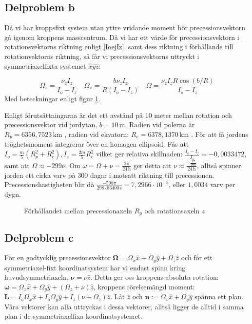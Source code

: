 \documentclass[12pt,a4paper]{article}
\begin{document}
	\subsection{Delproblem b}
	Då vi har kroppsfixt system utan yttre vridande moment bör precessionsvektorn
	gå igenom kroppens masscentrum.  Då vi har ett värde för precessionsvektorn i 
	rotationsvektorns riktning enligt \eqref{IoejIz}, samt dess riktning i förhållande 
	till rotationvektorns riktning, så får vi precessionsvektorns uttryckt i 
	symmetriaxelfixta systemet $\hat{x}\hat{y}\hat{z}$:
	
	\begin{equation*}
		\Omega_z = \frac{\nu_z I_z}{I_o-I_z}
		\hspace{12pt}
		\Omega_x = \frac{b \nu_z I_z}{R(I_o-I_z)}
		\hspace{12pt}
		\Omega = \frac{\nu_z I_z R \cos(b/R)}{I_o-I_z}
	\end{equation*}
	Med beteckningar enligt figur \ref{jorden}.

	Enligt förutsättningarna är det ett avstånd på 10 meter mellan rotation och
	precessionsvektor vid jordytan, $b=10 \,\mathrm{m}$. Radien vid polerna är $R_p= 6356,7523 \,\mathrm{km}$ \footnotemark[1],
	radien vid ekvatorn: $R_e=6378,1370 \,\mathrm{km}$ \footnotemark[1]. För att få jordens tröghetsmoment integrerar över en homogen ellipsoid.
	Fås att $I_o = \frac{m}{5}(R_p^2+R_e^2), I_z = \frac{2m}{5}R_e^2$ vilket ger relativa
	skillnaden: $\frac{I_o-I_z}{I_z} = -0,0033472$, samt att $\Omega \approx -299\nu$. Om
	$\omega=\Omega+\nu = \frac{2\pi}{24 \,\mathrm{h}}$ ger detta att
	$\nu \approx \frac{-\frac{2\pi}{298}}{24 \,\mathrm{h}}$, alltså spinner jorden ett cirka varv på 300
	dagar i motsatt riktning till precessionen. Precessionshastigheten blir då $\frac{-598\pi}{298 \cdot 86400 \,\mathrm{s}} = 7,2966 \cdot 10^{-5}$, eller $1,0034$ varv per dygn.

	\begin{figure}
		\begin{center}
			
			\caption{Förhållandet mellan precessionaxeln $R_p$ och rotationsaxeln $z$}
                        \label{jorden}
		\end{center}
	\end{figure}

	\subsection{Delproblem c}
		För en godtycklig precessionsvektor $\boldsymbol{\Omega}= \Omega_x \hat{x} + \Omega_y \hat{y} + \Omega_z \hat{z}$
		och för ett symmetriaxel-fixt 
		koordinatsystem har vi endast spinn kring huvudsymmetriaxeln, $\boldsymbol{\nu}=\nu \hat{z}$.
		Detta ger oss kroppens absoluta rotation: 
		$\boldsymbol{\omega}=\Omega_x \hat{x} + \Omega_y \hat{y} + (\Omega_z + \nu )\hat{z}$, kroppens rörelsemängd moment: 
		$\mathbf{L}=I_o \Omega_x \hat{x} + I_o \Omega_y \hat{y} + I_z (\nu + \Omega_z) \hat{z}$.
		Låt $\hat{z}$ och $\mathbf{n} := \Omega_x \hat{x} + \Omega_y \hat{y}$ 
		spänna ett plan. Våra vektorer kan alla uttryckas i dessa vektorer, alltså ligger de alltid i samma plan i de symmetriaxelfixa koordinatsystemet. 
		
\end{document}

